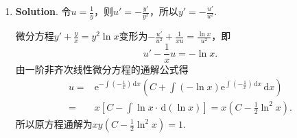 \documentclass[../main.tex]{subfiles}
\begin{document}
\begin{enumerate}
    \item \textbf{Solution}. 令$u=\frac{1}{y}$，则$u'=-\frac{y'}{y^{2}}$，所以$y
              '=-\frac{u'}{u^{2}}$.

          微分方程$y'+\frac{y}{x}=y^{2}\ln x$变形为$-\frac{u'}{u^{2}}+\frac{1}{xu}=\frac{\ln
                  x}{u^{2}}$，即
          \[
              u'-\frac{1}{x}u=-\ln x.
          \]
          由一阶非齐次线性微分方程的通解公式得
          \[
              \begin{aligned}
                  u = {} & \mathrm{e}^{-\int\left(-\frac{1}{x}\right)\,\mathrm{d}x}\left(C+\int\left(-\ln x\right)\mathrm{e}^{\int\left(-\frac{1}{x}\right)\,\mathrm{d}x}\,\mathrm{d}x\right) \\
                  = {}   & x\left[C-\int\ln x\cdot\,\mathrm{d}\left(\ln x\right)\right] = x\left(C-\frac{1}{2}\ln^{2} x\right).
              \end{aligned}
          \]
          所以原方程通解为$xy\left(C-\frac{1}{2}\ln^{2} x\right)=1$.
\end{enumerate}
\end{document}
